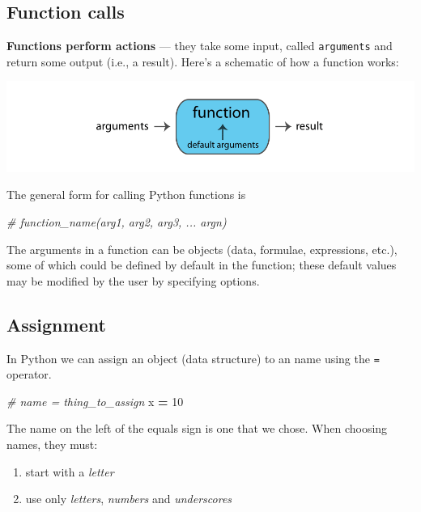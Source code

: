 \documentclass[]{book}
\newenvironment{Shaded}{\begin{snugshade}}{\end{snugshade}}
\newcommand{\CommentTok}[1]{\textcolor[rgb]{0.56,0.35,0.01}{\textit{#1}}}
\newcommand{\DecValTok}[1]{\textcolor[rgb]{0.00,0.00,0.81}{#1}}
\newcommand{\NormalTok}[1]{#1}
\newcommand{\OperatorTok}[1]{\textcolor[rgb]{0.81,0.36,0.00}{\textbf{#1}}}
\providecommand{\tightlist}{%
  \setlength{\itemsep}{0pt}\setlength{\parskip}{0pt}}
\begin{document}
\hypertarget{function-calls-1}{%
\subsection{Function calls}\label{function-calls-1}}

\textbf{Functions perform actions} --- they take some input, called \texttt{arguments} and return some
output (i.e., a result). Here's a schematic of how a function works:

\includegraphics{Python/PythonIntro/images/function.png}

The general form for calling Python functions is

\begin{Shaded}
\begin{Highlighting}[]
\CommentTok{# function_name(arg1, arg2, arg3, ... argn)}
\end{Highlighting}
\end{Shaded}

The arguments in a function can be objects (data, formulae, expressions, etc.),
some of which could be defined by default in the function; these default values may
be modified by the user by specifying options.

\hypertarget{assignment-1}{%
\subsection{Assignment}\label{assignment-1}}

In Python we can assign an object (data structure) to an name using the \texttt{=} operator.

\begin{Shaded}
\begin{Highlighting}[]
\CommentTok{# name = thing_to_assign}
\NormalTok{x }\OperatorTok{=} \DecValTok{10}
\end{Highlighting}
\end{Shaded}

The name on the left of the equals sign is one that we chose. When choosing names, they must:

\begin{enumerate}
\def\labelenumi{\arabic{enumi}.}
\tightlist
\item
  start with a \emph{letter}
\item
  use only \emph{letters}, \emph{numbers} and \emph{underscores}
\end{enumerate}
\end{document}
